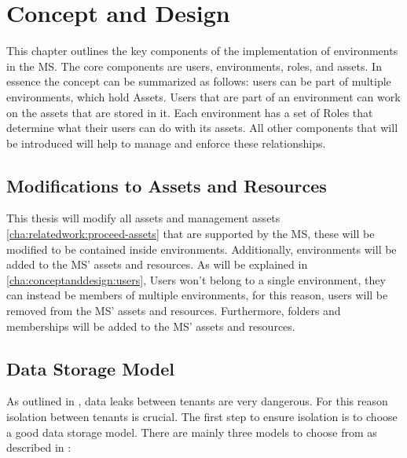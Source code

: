 \chapter{Concept and Design}
\label{cha:conceptanddesign}

This chapter outlines the key components of the implementation of environments in the MS.
The core components are users, environments, roles, and assets.
In essence the concept can be summarized as follows: users can be part of multiple
environments, which hold Assets.
Users that are part of an environment can work on the assets that are stored in it.
Each environment has a set of Roles that determine what their users can do with its
assets.
All other components that will be introduced will help to manage and enforce these relationships.

\section{Modifications to Assets and Resources}

This thesis will modify all assets and management assets \ref{cha:relatedwork:proceed-assets}
that are supported by the MS,
these will be modified to be contained inside environments.
Additionally, environments will be added to the MS' assets and resources.
As will be explained in \ref{cha:conceptanddesign:users}, Users won't belong to a single
environment, they can instead be members of multiple environments, for this reason,
users will be removed from the MS' assets and resources.
Furthermore, folders and  memberships will be added to the MS' assets and
resources.

\section{Data Storage Model}

As outlined in \cite[3.3]{multi-tenant-dream-or-nightmare},
data leaks between tenants are very dangerous.
For this reason isolation between tenants is crucial.
The first step to ensure isolation is to choose a good data storage model.
There are mainly three models to choose from as described in
\cite[4.1]{Pushpan2024MultiTenantArchitecture}:

